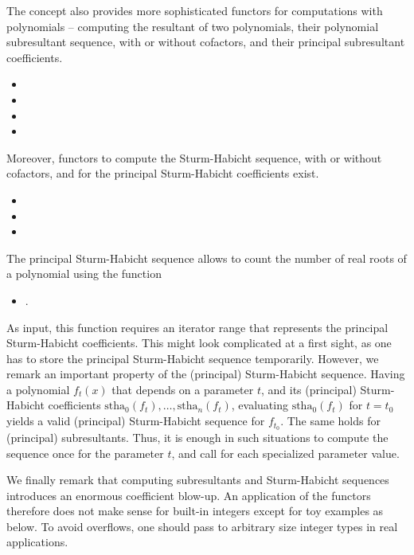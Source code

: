 The  concept also provides more sophisticated functors
for computations with polynomials --
computing the resultant of two polynomials, 
their polynomial subresultant sequence, with or without cofactors,
and their principal subresultant coefficients.
%
\begin{itemize}
\item {}\ccGlue
\item {}\ccGlue
\item {}\ccGlue
\item {}
\end{itemize}
%
Moreover, functors to compute the Sturm-Habicht sequence, with or without
cofactors, and for the principal Sturm-Habicht coefficients exist.
%
\begin{itemize}
\item {}\ccGlue
\item {}\ccGlue
\item {}
\end{itemize}
%
The principal Sturm-Habicht sequence allows to count the number of
real roots of a polynomial using the function
\begin{itemize}
\item {}.
\end{itemize}
As input, this function requires an iterator range that represents
the principal Sturm-Habicht coefficients. 
This might look complicated at a first sight,
as one has to store the principal Sturm-Habicht sequence temporarily.
However, we remark an important property of the (principal) Sturm-Habicht
sequence. Having a polynomial $f_t(x)$ that depends on a parameter $t$,
and its (principal) Sturm-Habicht coefficients 
$\mathrm{stha}_0(f_t),\ldots,\mathrm{stha}_n(f_t)$, evaluating 
$\mathrm{stha}_0(f_t)$ for $t=t_0$ yields a valid (principal)
Sturm-Habicht sequence for $f_{t_0}$. The same holds for (principal)
subresultants. Thus, it is enough in such situations to compute
the sequence once for the parameter $t$, and call 
 for each specialized parameter
value.

We finally remark that computing subresultants and Sturm-Habicht sequences
introduces an enormous coefficient blow-up.
An application of the functors therefore does not make sense
for built-in integers except for toy examples as below.
To avoid overflows, one should pass to arbitrary size integer types
in real applications.

